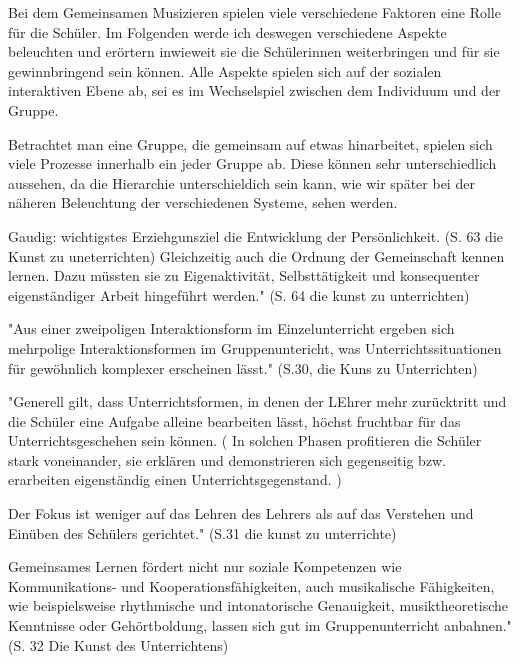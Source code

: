 









Bei dem Gemeinsamen Musizieren spielen viele verschiedene Faktoren eine Rolle
für die Schüler. Im Folgenden werde ich deswegen verschiedene Aspekte
beleuchten und erörtern inwieweit sie die Schülerinnen weiterbringen und für sie
gewinnbringend sein können.
Alle Aspekte spielen sich auf der sozialen interaktiven Ebene ab, sei es im
Wechselspiel zwischen dem Individuum und der Gruppe. 

Betrachtet man eine Gruppe, die gemeinsam auf etwas hinarbeitet, spielen sich
viele Prozesse innerhalb ein jeder Gruppe ab. Diese können sehr unterschiedlich
aussehen, da die Hierarchie unterschieldich sein kann, wie wir später bei der
näheren Beleuchtung der verschiedenen Systeme, sehen werden. 

Gaudig: wichtigstes Erziehgunsziel die Entwicklung der Persönlichkeit. (S. 63
die Kunst zu uneterrichten) Gleichzeitig auch die Ordnung der Gemeinschaft
kennen lernen. Dazu müssten sie zu Eigenaktivität, Selbsttätigkeit und konsequenter
eigenständiger Arbeit hingeführt werden." (S. 64 die kunst zu unterrichten)

"Aus einer zweipoligen Interaktionsform im Einzelunterricht ergeben sich
mehrpolige Interaktionsformen im Gruppenuntericht, was Unterrichtssituationen
für gewöhnlich komplexer erscheinen lässt." (S.30, die Kuns zu Unterrichten)


"Generell gilt, dass Unterrichtsformen, in denen der LEhrer mehr zurücktritt und
die Schüler eine Aufgabe alleine bearbeiten lässt, höchst fruchtbar für das
Unterrichtsgeschehen sein können. ( In solchen Phasen profitieren die Schüler
stark voneinander, sie erklären und demonstrieren sich gegenseitig bzw.
erarbeiten eigenständig einen Unterrichtsgegenstand. ) 

Der Fokus ist weniger auf
das Lehren des Lehrers als auf das Verstehen und Einüben des Schülers
gerichtet."  (S.31 die kunst zu unterrichte)


Gemeinsames Lernen fördert nicht nur soziale Kompetenzen wie Kommunikations- und
Kooperationsfähigkeiten, auch musikalische Fähigkeiten, wie beispielsweise
rhythmische und intonatorische Genauigkeit, musiktheoretische Kenntnisse oder
Gehörtboldung, lassen sich gut im Gruppenunterricht anbahnen." (S. 32 Die Kunst
des Unterrichtens)

